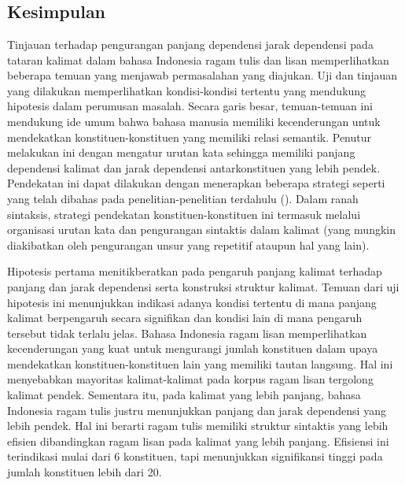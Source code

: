 \chapter{\kesimpulan}


\section{Kesimpulan}

Tinjauan terhadap pengurangan panjang dependensi  jarak dependensi pada tataran kalimat dalam bahasa Indonesia ragam tulis dan lisan memperlihatkan beberapa temuan yang menjawab permasalahan yang diajukan. Uji dan tinjauan yang dilakukan memperlihatkan kondisi-kondisi tertentu yang mendukung hipotesis dalam perumusan masalah. Secara garis besar, temuan-temuan ini mendukung ide umum bahwa bahasa manusia memiliki kecenderungan untuk mendekatkan konstituen-konstituen yang memiliki relasi semantik. Penutur melakukan ini dengan mengatur urutan kata sehingga memiliki panjang dependensi kalimat dan jarak dependensi antarkonstituen yang lebih pendek. Pendekatan ini dapat dilakukan dengan menerapkan beberapa strategi seperti yang telah dibahas pada penelitian-penelitian terdahulu (\citealp{jaeger2006redundancy, gildea2015human}). Dalam ranah sintaksis, strategi pendekatan konstituen-konstituen ini termasuk melalui organisasi urutan kata dan pengurangan sintaktis dalam kalimat (yang mungkin diakibatkan oleh pengurangan unsur yang repetitif ataupun hal yang lain). 

Hipotesis pertama menitikberatkan pada pengaruh panjang kalimat terhadap panjang dan jarak dependensi serta konstruksi struktur kalimat. Temuan dari uji hipotesis ini menunjukkan indikasi adanya kondisi tertentu di mana panjang kalimat berpengaruh secara signifikan dan kondisi lain di mana pengaruh tersebut tidak terlalu jelas. Bahasa Indonesia ragam lisan memperlihatkan kecenderungan yang kuat untuk mengurangi jumlah konstituen dalam upaya mendekatkan konstituen-konstituen lain yang memiliki tautan langsung. Hal ini menyebabkan mayoritas kalimat-kalimat pada korpus ragam lisan tergolong kalimat pendek. Sementara itu, pada kalimat yang lebih panjang, bahasa Indonesia ragam tulis justru menunjukkan panjang dan jarak dependensi yang lebih pendek. Hal ini berarti ragam tulis memiliki struktur sintaktis yang lebih efisien dibandingkan ragam lisan pada kalimat yang lebih panjang. Efisiensi ini terindikasi mulai dari 6 konstituen, tapi menunjukkan signifikansi tinggi pada jumlah konstituen lebih dari 20. 


